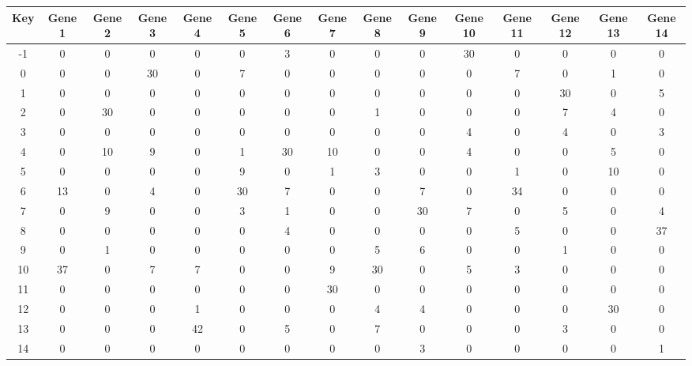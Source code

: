 \begin{tabular}{|c|c|c|c|c|c|c|c|c|c|c|c|c|c|c|}
\hline
Key & Gene 1 & Gene 2 & Gene 3 & Gene 4 & Gene 5 & Gene 6 & Gene 7 & Gene 8 & Gene 9 & Gene 10 & Gene 11 & Gene 12 & Gene 13 & Gene 14 \\
\hline
-1 & 0 & 0 & 0 & 0 & 0 & 3 & 0 & 0 & 0 & 30 & 0 & 0 & 0 & 0 \\
0 & 0 & 0 & 30 & 0 & 7 & 0 & 0 & 0 & 0 & 0 & 7 & 0 & 1 & 0 \\
1 & 0 & 0 & 0 & 0 & 0 & 0 & 0 & 0 & 0 & 0 & 0 & 30 & 0 & 5 \\
2 & 0 & 30 & 0 & 0 & 0 & 0 & 0 & 1 & 0 & 0 & 0 & 7 & 4 & 0 \\
3 & 0 & 0 & 0 & 0 & 0 & 0 & 0 & 0 & 0 & 4 & 0 & 4 & 0 & 3 \\
4 & 0 & 10 & 9 & 0 & 1 & 30 & 10 & 0 & 0 & 4 & 0 & 0 & 5 & 0 \\
5 & 0 & 0 & 0 & 0 & 9 & 0 & 1 & 3 & 0 & 0 & 1 & 0 & 10 & 0 \\
6 & 13 & 0 & 4 & 0 & 30 & 7 & 0 & 0 & 7 & 0 & 34 & 0 & 0 & 0 \\
7 & 0 & 9 & 0 & 0 & 3 & 1 & 0 & 0 & 30 & 7 & 0 & 5 & 0 & 4 \\
8 & 0 & 0 & 0 & 0 & 0 & 4 & 0 & 0 & 0 & 0 & 5 & 0 & 0 & 37 \\
9 & 0 & 1 & 0 & 0 & 0 & 0 & 0 & 5 & 6 & 0 & 0 & 1 & 0 & 0 \\
10 & 37 & 0 & 7 & 7 & 0 & 0 & 9 & 30 & 0 & 5 & 3 & 0 & 0 & 0 \\
11 & 0 & 0 & 0 & 0 & 0 & 0 & 30 & 0 & 0 & 0 & 0 & 0 & 0 & 0 \\
12 & 0 & 0 & 0 & 1 & 0 & 0 & 0 & 4 & 4 & 0 & 0 & 0 & 30 & 0 \\
13 & 0 & 0 & 0 & 42 & 0 & 5 & 0 & 7 & 0 & 0 & 0 & 3 & 0 & 0 \\
14 & 0 & 0 & 0 & 0 & 0 & 0 & 0 & 0 & 3 & 0 & 0 & 0 & 0 & 1 \\
\hline
\end{tabular}